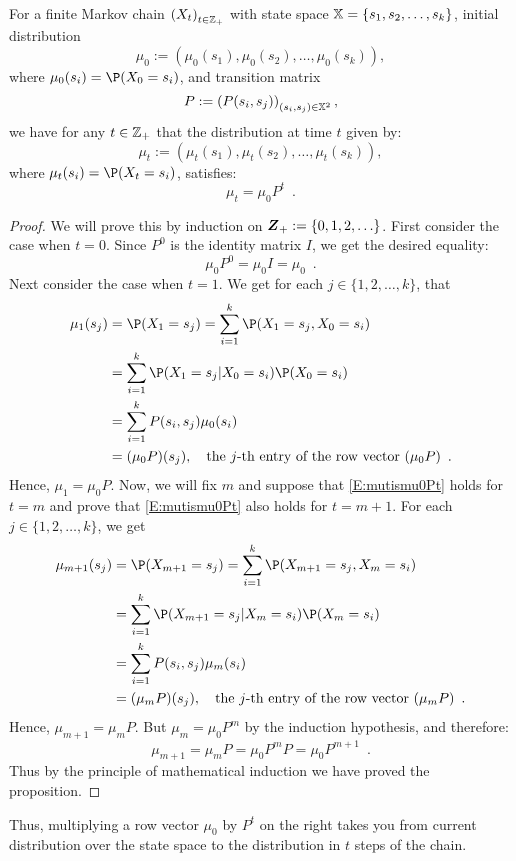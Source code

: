 \begin{prop}\label{P:FiniteMCProbsAtTimet}
For a finite Markov chain $\left(X_t\right)_{t \in \mathbb{Z}_+}$ with state space $\mathbb{X}=\{s_1,s_2,\ldots,s_k\}$, initial distribution $$\mu_0 := \left( \mu_0(s_1), \mu_0(s_2), \ldots, \mu_0(s_k) \right),$$ where $\mu_0(s_i) = \P(X_0=s_i)$, and transition matrix $$P := \left(P(s_i,s_j)\right)_{(s_i,s_j)\in \mathbb{X}^2},$$ we have for any $t \in \mathbb{Z}_+$ that the distribution at time $t$ given by:
$$\mu_t := \left( \mu_t(s_1), \mu_t(s_2), \ldots, \mu_t(s_k) \right),$$
where $\mu_t(s_i) = \P(X_t=s_i)$, satisfies:
\begin{equation}\label{E:mutismu0Pt}
\mu_t = \mu_0 P^t \enspace .
\end{equation}
\begin{proof}
We will prove this by induction on $\Z_+:=\{0,1,2,\ldots\}$.  First consider the case when $t=0$.  Since $P^0$ is the identity matrix $I$, we get the desired equality:
\[
\mu_0 P^0 = \mu_0 I = \mu_0 \enspace .
\]
Next consider the case when $t=1$.  We get for each $j \in \{1,2,\ldots,k\}$, that
\begin{align*}
\mu_1(s_j) &= \P(X_1 = s_j) = \sum_{i=1}^k \P(X_1=s_j,X_0=s_i)\\
&= \sum_{i=1}^k \P(X_1=s_j | X_0=s_i) \P(X_0=s_i) \\
&= \sum_{i=1}^k P(s_i,s_j) \mu_0(s_i)\\
&= (\mu_0 P)(s_j), \quad \text{the $j$-th entry of the row vector $(\mu_0 P)$} \enspace .
\end{align*}
Hence, $\mu_1=\mu_0 P$.  Now, we will fix $m$ and suppose that \eqref{E:mutismu0Pt} holds for $t=m$ and prove that \eqref{E:mutismu0Pt} also holds for $t=m+1$.  
For each $j \in \{1,2,\ldots,k\}$, we get
\begin{align*}
\mu_{m+1}(s_j) &= \P(X_{m+1} = s_j) = \sum_{i=1}^k \P(X_{m+1}=s_j,X_m=s_i)\\
&= \sum_{i=1}^k \P(X_{m+1}=s_j | X_m=s_i) \P(X_m=s_i) \\
&= \sum_{i=1}^k P(s_i,s_j) \mu_m(s_i)\\
&= (\mu_m P)(s_j), \quad \text{the $j$-th entry of the row vector $(\mu_m P)$} \enspace .
\end{align*}
Hence, $\mu_{m+1}=\mu_m P$.  But $\mu_{m}=\mu_0 P^m$ by the induction hypothesis, and therefore:
\[
\mu_{m+1} = \mu_m P = \mu_0 P^m P = \mu_0 P^{m+1} \enspace .
\]
Thus by the principle of mathematical induction we have proved the proposition.
\end{proof}
\end{prop}
Thus, multiplying a row vector $\mu_0$ by $P^t$ on the right takes you from current distribution over the state space to the distribution in $t$ steps of the chain.  

